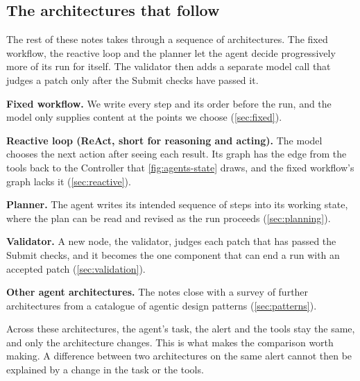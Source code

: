 \subsection{The architectures that follow}
\label{sec:agents-route}

The rest of these notes takes \msa{} through a sequence of architectures. The fixed workflow, the
reactive loop and the planner let the agent decide progressively more of its run for itself. The
validator then adds a separate model call that judges a patch only after the Submit checks have
passed it.
\bi
\item \textbf{Fixed workflow.} We write every step and its order before the run, and the model
only supplies content at the points we choose (\cref{sec:fixed}).
\item \textbf{Reactive loop (ReAct, short for reasoning and acting).} The model chooses the next
action after seeing each result. Its graph has the edge from the tools back to the Controller that
\cref{fig:agents-state} draws, and the fixed workflow's graph lacks it (\cref{sec:reactive}).
\item \textbf{Planner.} The agent writes its intended sequence of steps into its working state,
where the plan can be read and revised as the run proceeds (\cref{sec:planning}).
\item \textbf{Validator.} A new node, the validator, judges each patch that has passed the Submit
checks, and it becomes the one component that can end a run with an accepted patch
(\cref{sec:validation}).
\item \textbf{Other agent architectures.} The notes close with a survey of further architectures
from a catalogue of agentic design patterns (\cref{sec:patterns}).
\ei

Across these architectures, the agent's task, the alert and the tools stay the same, and only the
architecture changes. This is what makes the comparison worth making. A difference between two
architectures on the same alert cannot then be explained by a change in the task or the tools.

